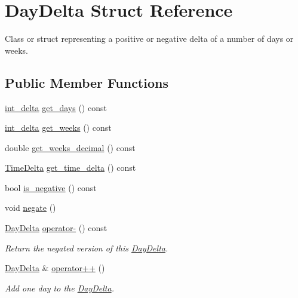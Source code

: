 \hypertarget{structDayDelta}{\section{\-Day\-Delta \-Struct \-Reference}
\label{structDayDelta}
}


\-Class or struct representing a positive or negative delta of a number of days or weeks.  


\subsection*{\-Public \-Member \-Functions}
\begin{DoxyCompactItemize}
\item 
\hyperlink{types_8h_a8a67cf99971c5cfeeaa2380ba84a4c92}{int\-\_\-delta} \hyperlink{structDayDelta_a59159b1d56a28b5f2a693979e4b280a1}{get\-\_\-days} () const 
\item 
\hyperlink{types_8h_a8a67cf99971c5cfeeaa2380ba84a4c92}{int\-\_\-delta} \hyperlink{structDayDelta_a2f4510044f51ebb61ffef942ee173de2}{get\-\_\-weeks} () const 
\item 
double \hyperlink{structDayDelta_a2e3251e65463940ef87d447d51948e05}{get\-\_\-weeks\-\_\-decimal} () const 
\item 
\hyperlink{structTimeDelta}{\-Time\-Delta} \hyperlink{structDayDelta_ab10777d5c043236aa613081d56317642}{get\-\_\-time\-\_\-delta} () const 
\item 
bool \hyperlink{structDayDelta_a10d6b9eac43322a957f7c3dfbedc2862}{is\-\_\-negative} () const 
\item 
void \hyperlink{structDayDelta_a23b9453556a255f5413aee21b12938a6}{negate} ()
\item 
\hyperlink{structDayDelta}{\-Day\-Delta} \hyperlink{structDayDelta_ab147a13f61362001a4acdaa1b782d1cf}{operator-\/} () const 
\begin{DoxyCompactList}\small\item\em \-Return the negated version of this \hyperlink{structDayDelta}{\-Day\-Delta}. \end{DoxyCompactList}\item 
\hyperlink{structDayDelta}{\-Day\-Delta} \& \hyperlink{structDayDelta_aa0a78ca9d3a6a3241211e22d638e0323}{operator++} ()
\begin{DoxyCompactList}\small\item\em \-Add one day to the \hyperlink{structDayDelta}{\-Day\-Delta}. \end{DoxyCompactList}\item 

\end{DoxyCompactItemize}
